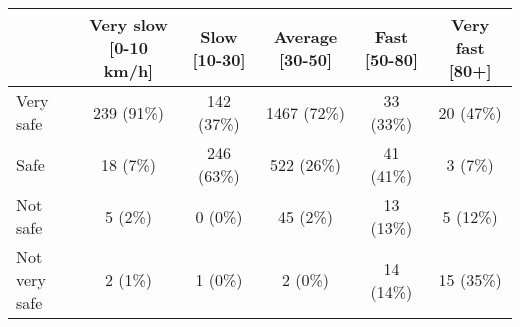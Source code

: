\begin{tabular}{l c|c|c|c|c} \hline  & Very slow [0-10 km/h] & Slow [10-30] & Average [30-50] & Fast [50-80] & Very fast [80+] \\ 
\hline Very safe & 239 (91\%) & 142 (37\%) & 1467 (72\%) & 33 (33\%) & 20 (47\%) \\ 
  Safe & 18 (7\%) & 246 (63\%) & 522 (26\%) & 41 (41\%) & 3 (7\%) \\ 
  Not safe & 5 (2\%) & 0 (0\%) & 45 (2\%) & 13 (13\%) & 5 (12\%) \\ 
  Not very safe & 2 (1\%) & 1 (0\%) & 2 (0\%) & 14 (14\%) & 15 (35\%) \\ 
 \hline \end{tabular}